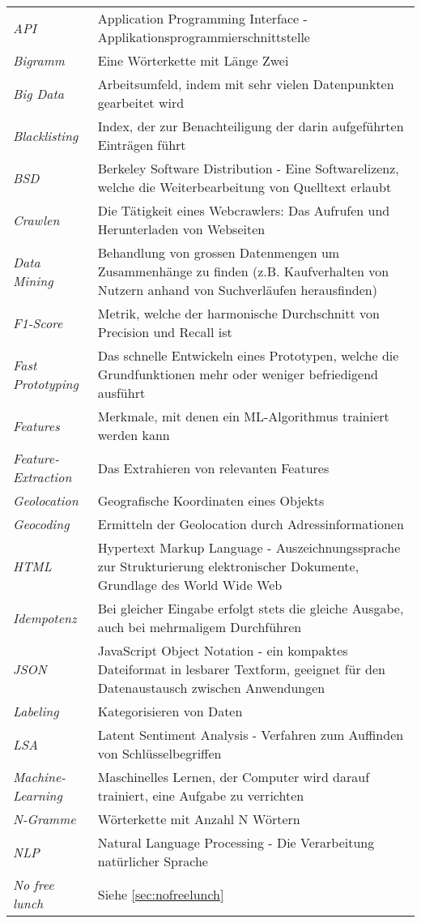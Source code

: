 \begin{table}[H]
	\begin{tabular}{>{\em}p{4cm}p{12cm}}
		API & Application Programming Interface - Applikationsprogrammierschnittstelle\\
		Bigramm & Eine Wörterkette mit Länge Zwei\\
		Big Data & Arbeitsumfeld, indem mit sehr vielen Datenpunkten gearbeitet wird\\
		Blacklisting & Index, der zur Benachteiligung der darin aufgeführten Einträgen führt\\
		BSD & Berkeley Software Distribution - Eine Softwarelizenz, welche die Weiterbearbeitung von Quelltext erlaubt\\
		Crawlen & Die Tätigkeit eines Webcrawlers: Das Aufrufen und Herunterladen von Webseiten\\
		Data Mining & Behandlung von grossen Datenmengen um Zusammenhänge zu finden (z.B. Kaufverhalten von Nutzern anhand von Suchverläufen herausfinden)\\
		F1-Score & Metrik, welche der harmonische Durchschnitt von Precision und Recall ist\\
		Fast Prototyping & Das schnelle Entwickeln eines Prototypen, welche die Grundfunktionen mehr oder weniger befriedigend ausführt\\
		Features & Merkmale, mit denen ein ML-Algorithmus trainiert werden kann\\
		Feature-Extraction & Das Extrahieren von relevanten Features\\
		Geolocation & Geografische Koordinaten eines Objekts\\
		Geocoding & Ermitteln der Geolocation durch Adressinformationen\\
		HTML & Hypertext Markup Language - Auszeichnungssprache zur Strukturierung elektronischer Dokumente, Grundlage des World Wide Web\\
		Idempotenz & Bei gleicher Eingabe erfolgt stets die gleiche Ausgabe, auch bei mehrmaligem Durchführen\\
		JSON & JavaScript Object Notation - ein kompaktes Dateiformat in lesbarer Textform, geeignet für den Datenaustausch zwischen Anwendungen\\
		Labeling & Kategorisieren von Daten\\
		LSA & Latent Sentiment Analysis - Verfahren zum Auffinden von Schlüsselbegriffen\\
		Machine-Learning & Maschinelles Lernen, der Computer wird darauf trainiert, eine Aufgabe zu verrichten\\
		N-Gramme & Wörterkette mit Anzahl N Wörtern\\
		NLP & Natural Language Processing - Die Verarbeitung natürlicher Sprache\\
		No free lunch & Siehe \cref{sec:nofreelunch}\\
		
	\end{tabular}
\end{table}
